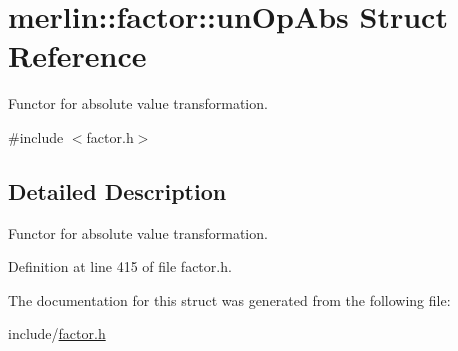 \hypertarget{structmerlin_1_1factor_1_1unOpAbs}{}\section{merlin\+:\+:factor\+:\+:un\+Op\+Abs Struct Reference}
\label{structmerlin_1_1factor_1_1unOpAbs}


Functor for absolute value transformation.  




{\ttfamily \#include $<$factor.\+h$>$}



\subsection{Detailed Description}
Functor for absolute value transformation. 

Definition at line 415 of file factor.\+h.



The documentation for this struct was generated from the following file\+:\begin{DoxyCompactItemize}
\item 
include/\hyperlink{factor_8h}{factor.\+h}\end{DoxyCompactItemize}
